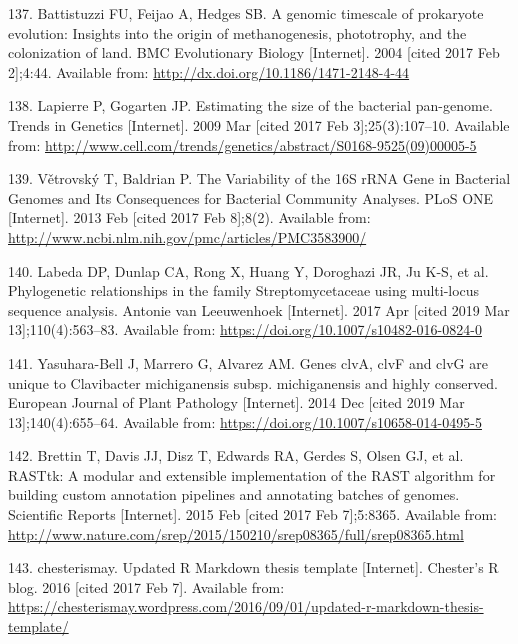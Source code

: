 \documentclass[12pt,twoside]{reedthesis}
\begin{document}
  \hypertarget{ref-battistuzzi_genomic_2004}{}
  137. Battistuzzi FU, Feijao A, Hedges SB. A genomic timescale of
  prokaryote evolution: Insights into the origin of methanogenesis,
  phototrophy, and the colonization of land. BMC Evolutionary Biology
  {[}Internet{]}. 2004 {[}cited 2017 Feb 2{]};4:44. Available from:
  \url{http://dx.doi.org/10.1186/1471-2148-4-44}
  
  \hypertarget{ref-lapierre_estimating_2009}{}
  138. Lapierre P, Gogarten JP. Estimating the size of the bacterial
  pan-genome. Trends in Genetics {[}Internet{]}. 2009 Mar {[}cited 2017
  Feb 3{]};25(3):107--10. Available from:
  \url{http://www.cell.com/trends/genetics/abstract/S0168-9525(09)00005-5}
  
  \hypertarget{ref-vetrovsky_variability_2013}{}
  139. Větrovský T, Baldrian P. The Variability of the 16S rRNA Gene in
  Bacterial Genomes and Its Consequences for Bacterial Community Analyses.
  PLoS ONE {[}Internet{]}. 2013 Feb {[}cited 2017 Feb 8{]};8(2). Available
  from: \url{http://www.ncbi.nlm.nih.gov/pmc/articles/PMC3583900/}
  
  \hypertarget{ref-labeda_phylogenetic_2017}{}
  140. Labeda DP, Dunlap CA, Rong X, Huang Y, Doroghazi JR, Ju K-S, et al.
  Phylogenetic relationships in the family Streptomycetaceae using
  multi-locus sequence analysis. Antonie van Leeuwenhoek {[}Internet{]}.
  2017 Apr {[}cited 2019 Mar 13{]};110(4):563--83. Available from:
  \url{https://doi.org/10.1007/s10482-016-0824-0}
  
  \hypertarget{ref-yasuhara-bell_genes_2014}{}
  141. Yasuhara-Bell J, Marrero G, Alvarez AM. Genes clvA, clvF and clvG
  are unique to Clavibacter michiganensis subsp. michiganensis and highly
  conserved. European Journal of Plant Pathology {[}Internet{]}. 2014 Dec
  {[}cited 2019 Mar 13{]};140(4):655--64. Available from:
  \url{https://doi.org/10.1007/s10658-014-0495-5}
  
  \hypertarget{ref-brettin_rasttk:_2015}{}
  142. Brettin T, Davis JJ, Disz T, Edwards RA, Gerdes S, Olsen GJ, et al.
  RASTtk: A modular and extensible implementation of the RAST algorithm
  for building custom annotation pipelines and annotating batches of
  genomes. Scientific Reports {[}Internet{]}. 2015 Feb {[}cited 2017 Feb
  7{]};5:8365. Available from:
  \url{http://www.nature.com/srep/2015/150210/srep08365/full/srep08365.html}
  
  \hypertarget{ref-chesterismay_updated_2016}{}
  143. chesterismay. Updated R Markdown thesis template {[}Internet{]}.
  Chester's R blog. 2016 {[}cited 2017 Feb 7{]}. Available from:
  \url{https://chesterismay.wordpress.com/2016/09/01/updated-r-markdown-thesis-template/}
  
\end{document}
